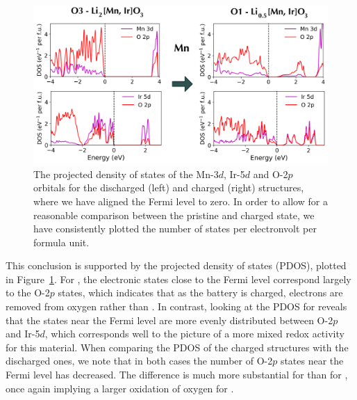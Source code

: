 \begin{refsection}
\begin{figure}[ht] 
\centering 
\captionsetup{width=0.9\linewidth}
\includegraphics[width=\textwidth]{Figures/batteries/charge_pdos_Mn_Ir.png} 
\caption{The projected density of states of the Mn-3$d$, Ir-5$d$ and O-2$p$ 
orbitals for the discharged (left) and charged (right) structures, where we 
have aligned the Fermi level to zero. In order to allow for a reasonable 
comparison between the pristine and charged state, we have consistently 
plotted the number of states per electronvolt per formula unit.} 
\label{batteries:fig-charge_pdos_Mn_Ir} 
\end{figure} 
 
This conclusion is supported by the projected density of states (PDOS), 
plotted in Figure~\ref{batteries:fig-charge_pdos_Mn_Ir}. For , the 
electronic states close to the Fermi level correspond largely to the O-2$p$ 
states, which indicates that as the battery is charged, electrons are removed 
from oxygen rather than . In contrast, looking at the PDOS for 
 reveals that the states near the Fermi level are more evenly 
distributed between O-2$p$ and Ir-5$d$, which corresponds well to the picture 
of a more mixed redox activity for this material. When comparing the PDOS of 
the charged structures with the discharged ones, we note that in both cases 
the number of O-2$p$ states near the Fermi level has decreased. The difference 
is much more substantial for  than for , once again 
implying a larger oxidation of oxygen for . 
 
 

\end{refsection}
